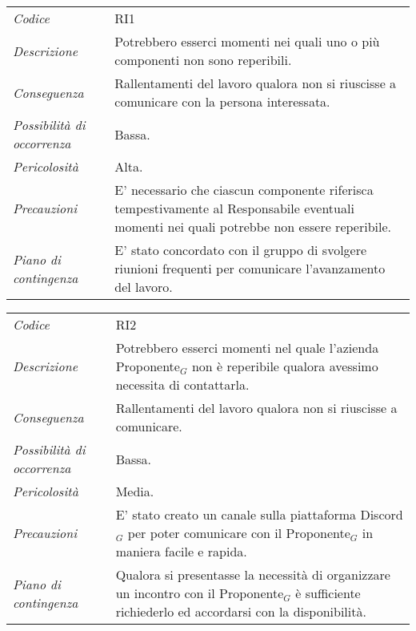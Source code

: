 {{{{{{{{{{{{\begin{center}
		\begin{longtable}{|p{5cm}|p{12cm}|}
			\hline
			\rowcolor{airforceblue}
			\multicolumn{2}{|c|}{\textit{Comunicazione interna}}\\
			\hline
			\textit{Codice} & RI1 \\
			\hline
			\textit{Descrizione} & Potrebbero esserci momenti nei quali uno o più componenti non sono reperibili. \\
			\hline
			\textit{Conseguenza} & Rallentamenti del lavoro qualora non si riuscisse a comunicare con la persona interessata. \\
			\hline
			\textit{Possibilità di occorrenza} & Bassa. \\
			\hline
			\textit{Pericolosità} & Alta. \\
			\hline
			\textit{Precauzioni} & E' necessario che ciascun componente riferisca tempestivamente al Responsabile eventuali momenti nei quali potrebbe non essere reperibile. \\
			\hline
			\textit{Piano di contingenza} & E' stato concordato con il gruppo di svolgere riunioni frequenti per comunicare l'avanzamento del lavoro.\\
			\hline
		\end{longtable}
	\end{center}

\def\tabularxcolumn#1{m{#1}}
{
	
	\begin{center}
		\renewcommand{\arraystretch}{1.4}
		
		\begin{longtable}{|p{5cm}|p{12cm}|}
			\hline
			\rowcolor{airforceblue}
			\multicolumn{2}{|c|}{\textit{Comunicazione esterna}}\\
			\hline
			\textit{Codice} & RI2 \\
			\hline
			\textit{Descrizione} & Potrebbero esserci momenti nel quale l'azienda Proponente$_G$ non è reperibile qualora avessimo necessita di contattarla. \\
			\hline
			\textit{Conseguenza} & Rallentamenti del lavoro qualora non si riuscisse a comunicare. \\
			\hline
			\textit{Possibilità di occorrenza} & Bassa. \\
			\hline
			\textit{Pericolosità} & Media. \\
			\hline
			\textit{Precauzioni} & E' stato creato un canale sulla piattaforma Discord$_G$ per poter comunicare con il Proponente$_G$ in maniera facile e rapida. \\
			\hline
			\textit{Piano di contingenza} & Qualora si presentasse la necessità di organizzare un incontro con il Proponente$_G$ è sufficiente richiederlo ed accordarsi con la disponibilità.\\
			\hline
		\end{longtable}
	\end{center}

}}}}}}}}}}}}}
